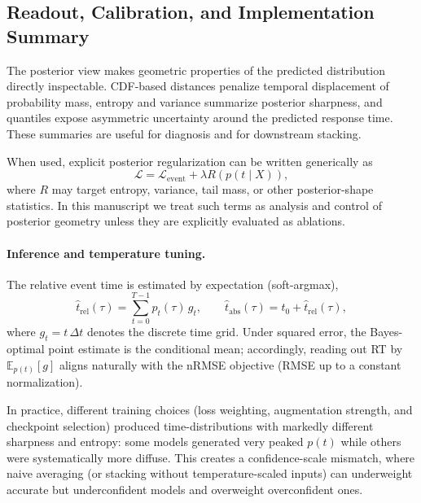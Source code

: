 \documentclass[12pt]{article}
\begin{document}
\subsection{Readout, Calibration, and Implementation Summary}

The posterior view makes geometric properties of the predicted distribution directly inspectable. CDF-based distances penalize temporal displacement of probability mass, entropy and variance summarize posterior sharpness, and quantiles expose asymmetric uncertainty around the predicted response time. These summaries are useful for diagnosis and for downstream stacking.

When used, explicit posterior regularization can be written generically as
\begin{equation}
\label{eq:posterior_regularized_objective}
\mathcal{L} = \mathcal{L}_{\mathrm{event}} + \lambda R\!\left(p(t\mid X)\right),
\end{equation}
where $R$ may target entropy, variance, tail mass, or other posterior-shape statistics. In this manuscript we treat such terms as analysis and control of posterior geometry unless they are explicitly evaluated as ablations.

\paragraph{Inference and temperature tuning.}
The relative event time is estimated by expectation (soft-argmax),
\begin{equation}
\label{eq:rt_soft_argmax}
\hat t_{\mathrm{rel}}(\tau)=\sum_{t=0}^{T-1} p_t(\tau)\, g_t,
\qquad
\hat t_{\mathrm{abs}}(\tau)=t_0+\hat t_{\mathrm{rel}}(\tau),
\end{equation}
where $g_t=t\,\Delta t$ denotes the discrete time grid. Under squared error, the Bayes-optimal point estimate is the
conditional mean; accordingly, reading out RT by $\mathbb{E}_{p(t)}[g]$ aligns naturally with the nRMSE objective (RMSE
up to a constant normalization).

In practice, different training choices (loss weighting, augmentation strength, and checkpoint selection) produced
time-distributions with markedly different sharpness and entropy: some models generated very peaked $p(t)$ while others
were systematically more diffuse. This creates a confidence-scale mismatch, where naive averaging (or stacking without
temperature-scaled inputs) can underweight accurate but underconfident models and overweight overconfident ones.
\end{document}
